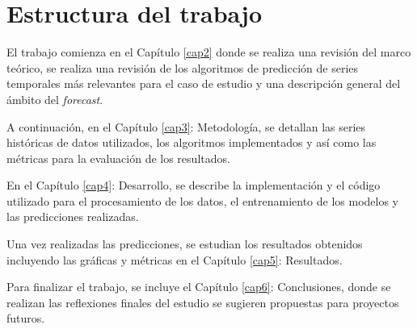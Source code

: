 \section{Estructura del trabajo}

El trabajo comienza en el Capítulo \ref{cap2} donde se realiza una revisión del marco teórico, se realiza una revisión de los algoritmos de predicción de series temporales más relevantes para el caso de estudio y una descripción general del ámbito del \textit{forecast}.

A continuación, en el Capítulo \ref{cap3}: Metodología, se detallan las series históricas de datos utilizados, los algoritmos implementados y así como las métricas para la evaluación de los resultados.

En el Capítulo \ref{cap4}: Desarrollo, se describe la implementación y el código utilizado para el procesamiento de los datos, el entrenamiento de los modelos y las predicciones realizadas.

Una vez realizadas las predicciones, se estudian los resultados obtenidos incluyendo las gráficas y métricas en el Capítulo \ref{cap5}: Resultados.

Para finalizar el trabajo, se incluye el Capítulo \ref{cap6}: Conclusiones, donde se realizan las reflexiones finales del estudio se sugieren propuestas para proyectos futuros.








